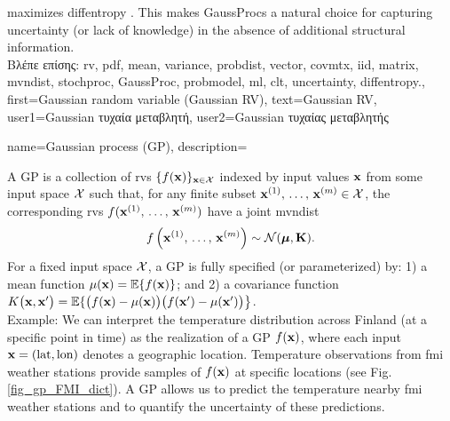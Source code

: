 {{		maximizes \gls{diffentropy} \cite[Th. 8.6.5]{coverthomas}. This makes \gls{GaussProc}s a 
		natural choice for capturing \gls{uncertainty} (or lack of knowledge) in the absence of additional 
		structural information.
		\\
		\foreignlanguage{greek}{Βλέπε επίσης:} \gls{rv}, \gls{pdf}, \gls{mean}, \gls{variance}, \gls{probdist}, \gls{vector}, \gls{covmtx}, 
		\gls{iid}, \gls{matrix}, \gls{mvndist}, \gls{stochproc}, \gls{GaussProc}, \gls{probmodel}, \gls{ml}, \gls{clt}, \gls{uncertainty}, \gls{diffentropy}.},
	first={Gaussian random variable (Gaussian RV)},
	text={Gaussian RV},
	user1={Gaussian \foreignlanguage{greek}{τυχαία μεταβλητή}}, %
	user2={Gaussian \foreignlanguage{greek}{τυχαίας μεταβλητής}} %
}

{name={Gaussian process (GP)}, 
  description={A GP is a collection of \gls{rv}s 
  	$\{f(\featurevec)\}_{\featurevec \in \featurespace}$ indexed by input values $\featurevec$ 
  	from some input space $\featurespace$ such that, for any finite subset 
  	$\featurevec^{(1)}, \,\ldots, \,\featurevec^{(\samplesize)} \in \featurespace$, 
  	the corresponding \gls{rv}s $f(\featurevec^{(1)}, \,\ldots, \,\featurevec^{(\samplesize)})$ 
	have a joint \gls{mvndist} 
  	\[
  	f \left( \featurevec^{(1)}, \,\ldots, \,\featurevec^{(\samplesize)} \right) \sim \mathcal{N}(\boldsymbol{\mu}, \mathbf{K}).
  	\]
  	For a fixed input space $\featurespace$, a GP is fully specified (or parameterized) by: 1) a \gls{mean} \gls{function} 
	$\mu(\featurevec) = \expect\{ f(\featurevec)\}$; and 2) a \gls{covariance} \gls{function} 
	$\kernelmap{\featurevec}{\featurevec'}= \expect\{ \big(f(\featurevec)-\mu(\featurevec)\big) \big(f(\featurevec')-\mu(\featurevec')\big) \big\}$.\\
  	Example: We can interpret the temperature distribution across Finland (at a specific 
  	point in time) as the \gls{realization} of a GP $f(\featurevec)$, where each input $\featurevec = (\text{lat}, \text{lon})$ 
  	denotes a geographic location. Temperature observations from \gls{fmi} weather stations provide 
  	\gls{sample}s of $f(\featurevec)$ at specific locations (see Fig. \ref{fig_gp_FMI_dict}). A GP allows us to 
  	predict the temperature nearby \gls{fmi} weather stations and to quantify the \gls{uncertainty} 
  	of these \gls{prediction}s. 
  	\begin{figure}[H]
  	\begin{center}
  		\begin{tikzpicture}

\end{tikzpicture}
\end{center}
\end{figure}}}
